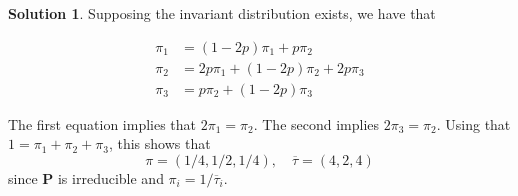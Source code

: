 \documentclass[12pt]{article}
\let\vec\mathbf
\theoremstyle{definition}
\newtheorem{sol}{Solution}
\theoremstyle{remark}
\begin{document}
\begin{sol}
    Supposing the invariant distribution exists, we have that

    \begin{align*}
        \pi_{1} &= (1-2p)\pi_{1} + p\pi_{2}\\ 
        \pi_{2} &= 2p \pi_{1} + (1-2p)\pi_{2} + 2p \pi_{3} \\
        \pi_{3} &= p \pi_{2} + (1-2p)\pi_{3}
    \end{align*}
\end{sol}
The first equation implies that $2\pi_{1} = \pi_{2}$. The second implies $2\pi_{3} = \pi_{2}$. Using that $1 = \pi_{1} + \pi_{2} + \pi_{3}$, this shows that
\begin{equation*}
    \pi = (1 /4 , 1 / 2, 1 /4), \quad \overline{\tau} = (4, 2 ,4)
\end{equation*}
since $\vec{P}$ is irreducible and $\pi_{i} = 1 / \overline{\tau}_{i}$.
\end{document}
